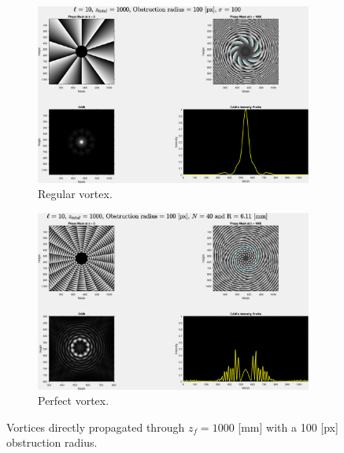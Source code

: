 \begin{figure}[htbp]
    \centering
    \begin{subfigure}[b]{0.45\textwidth}
        \centering
        \includegraphics[width=\textwidth]{images/c04/type=0_r=100_zi=0_zf=1000.eps}
        \caption{Regular vortex.}
    \end{subfigure}
    \hfill
    \begin{subfigure}[b]{0.45\textwidth}
        \centering
        \includegraphics[width=\textwidth]{images/c04/type=1_r=100_zi=0_zf=1000.eps}
        \caption{Perfect vortex.}
    \end{subfigure}
    \caption{Vortices directly propagated through $z_f = 1000$ [mm] with a 100 [px] obstruction radius.}
    \label{fig:Vortices_r=100_z=1000}
\end{figure}

